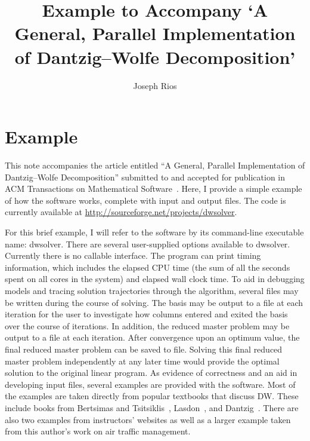 \documentclass[11pt]{article} %
\title{Example to Accompany `A General, Parallel Implementation of Dantzig--Wolfe Decomposition'}
\author{Joseph Rios}
\begin{document}
\maketitle

%
%
\section{Example}
\label{secOptions}
This note accompanies the article entitled ``A General, Parallel Implementation of Dantzig--Wolfe Decomposition'' submitted to and accepted for publication in ACM Transactions on Mathematical Software~\cite{RiosTOMS12}.  Here, I provide a simple example of how the software works, complete with input and output files.  The code is currently available at \url{http://sourceforge.net/projects/dwsolver}.

For this brief example, I will refer to the software by its command-line executable name:  dwsolver.  There are several user-supplied options available to dwsolver.  Currently there is no callable interface.  The program can print timing information, which includes the elapsed CPU time (the sum of all the seconds spent on all cores in the system) and elapsed wall clock time.  To aid in debugging models and tracing solution trajectories through the algorithm, several files may be written during the course of solving.  The basis may be output to a file at each iteration for the user to investigate how columns entered and exited the basis over the course of iterations.  In addition, the reduced master problem may be output to a file at each iteration.  After convergence upon an optimum value, the final reduced master problem can be saved to file.  Solving this final reduced master problem independently at any later time would provide the optimal solution to the original linear program.
%
%
As evidence of correctness and an aid in developing input files, several examples are provided with the software.  Most of the examples are taken directly from popular textbooks that discuss DW.  These include books from Bertsimas and Tsitsiklis~\cite{Bertsimas97}, Lasdon~\cite{Lasdon70}, and Dantzig~\cite{Dantzig63}.  There are also two examples from instructors' websites as well as a larger example taken from this author's work on air traffic management.
\end{document}
